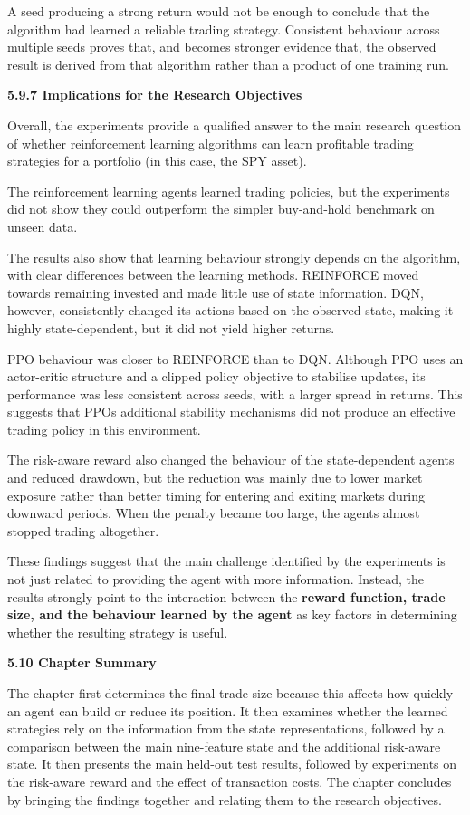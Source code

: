 A seed producing a strong return would not be enough to conclude that
the algorithm had learned a reliable trading strategy. Consistent
behaviour across multiple seeds proves that, and becomes stronger
evidence that, the observed result is derived from that algorithm rather
than a product of one training run.

\textbf{5.9.7 Implications for the Research Objectives}

Overall, the experiments provide a qualified answer to the main research
question of whether reinforcement learning algorithms can learn
profitable trading strategies for a portfolio (in this case, the SPY
asset).

The reinforcement learning agents learned trading policies, but the
experiments did not show they could outperform the simpler buy-and-hold
benchmark on unseen data.

The results also show that learning behaviour strongly depends on the
algorithm, with clear differences between the learning methods.
REINFORCE moved towards remaining invested and made little use of state
information. DQN, however, consistently changed its actions based on the
observed state, making it highly state-dependent, but it did not yield
higher returns.

PPO behaviour was closer to REINFORCE than to DQN. Although PPO uses an
actor-critic structure and a clipped policy objective to stabilise
updates, its performance was less consistent across seeds, with a larger
spread in returns. This suggests that PPO\textquotesingle s additional
stability mechanisms did not produce an effective trading policy in this
environment.

The risk-aware reward also changed the behaviour of the state-dependent
agents and reduced drawdown, but the reduction was mainly due to lower
market exposure rather than better timing for entering and exiting
markets during downward periods. When the penalty became too large, the
agents almost stopped trading altogether.

These findings suggest that the main challenge identified by the
experiments is not just related to providing the agent with more
information. Instead, the results strongly point to the interaction
between the \textbf{reward function, trade size, and the behaviour
learned by the agent} as key factors in determining whether the
resulting strategy is useful.

\textbf{5.10 Chapter Summary}

The chapter first determines the final trade size because this affects
how quickly an agent can build or reduce its position. It then examines
whether the learned strategies rely on the information from the state
representations, followed by a comparison between the main nine-feature
state and the additional risk-aware state. It then presents the main
held-out test results, followed by experiments on the risk-aware reward
and the effect of transaction costs. The chapter concludes by bringing
the findings together and relating them to the research objectives.

